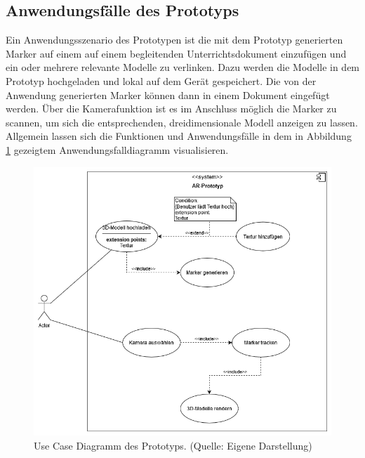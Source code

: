 \subsection{Anwendungsfälle des Prototyps}
Ein Anwendungsszenario des Prototypen ist die mit dem Prototyp generierten Marker auf einem auf einem begleitenden Unterrichtsdokument einzufügen und ein oder mehrere relevante Modelle zu verlinken. Dazu werden die Modelle in dem Prototyp hochgeladen und lokal auf dem Gerät gespeichert. Die von der Anwendung generierten Marker können dann in einem Dokument eingefügt werden. Über die Kamerafunktion ist es im Anschluss möglich die Marker zu scannen, um sich die entsprechenden, dreidimensionale Modell anzeigen zu lassen.\\ 
Allgemein lassen sich die Funktionen und Anwendungsfälle in dem in Abbildung \ref{fig:Use-Cases} gezeigtem Anwendungsfalldiagramm visualisieren.
\begin{figure}[h!]
\centering
\includegraphics[width=1.0\textwidth]{Abbildungen/use-case-diagram.png}
\caption[Use Cases des Prototyps]{Use Case Diagramm des Prototyps. (Quelle: Eigene Darstellung)}
\label{fig:Use-Cases}
\end{figure}


